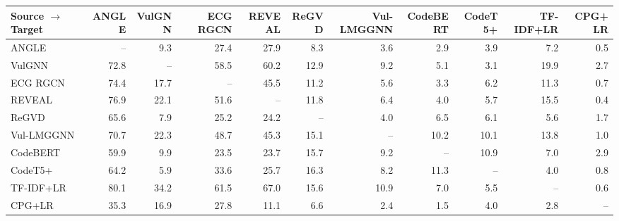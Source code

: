 \begin{tabular}{lrrrrrrrrrr}
\toprule
Source $\rightarrow$ Target & ANGLE & VulGNN & ECG RGCN & REVEAL & ReGVD & Vul-LMGGNN & CodeBERT & CodeT5+ & TF-IDF+LR & CPG+LR \\
\midrule
ANGLE & -- & 9.3 & 27.4 & 27.9 & 8.3 & 3.6 & 2.9 & 3.9 & 7.2 & 0.5 \\
VulGNN & 72.8 & -- & 58.5 & 60.2 & 12.9 & 9.2 & 5.1 & 3.1 & 19.9 & 2.7 \\
ECG RGCN & 74.4 & 17.7 & -- & 45.5 & 11.2 & 5.6 & 3.3 & 6.2 & 11.3 & 0.7 \\
REVEAL & 76.9 & 22.1 & 51.6 & -- & 11.8 & 6.4 & 4.0 & 5.7 & 15.5 & 0.4 \\
ReGVD & 65.6 & 7.9 & 25.2 & 24.2 & -- & 4.0 & 6.5 & 6.1 & 5.6 & 1.7 \\
Vul-LMGGNN & 70.7 & 22.3 & 48.7 & 45.3 & 15.1 & -- & 10.2 & 10.1 & 13.8 & 1.0 \\
CodeBERT & 59.9 & 9.9 & 23.5 & 23.7 & 15.7 & 9.2 & -- & 10.9 & 7.0 & 2.9 \\
CodeT5+ & 64.2 & 5.9 & 33.6 & 25.7 & 16.3 & 8.2 & 11.3 & -- & 4.0 & 0.8 \\
TF-IDF+LR & 80.1 & 34.2 & 61.5 & 67.0 & 15.6 & 10.9 & 7.0 & 5.5 & -- & 0.6 \\
CPG+LR & 35.3 & 16.9 & 27.8 & 11.1 & 6.6 & 2.4 & 1.5 & 4.0 & 2.8 & -- \\
\bottomrule
\end{tabular}
